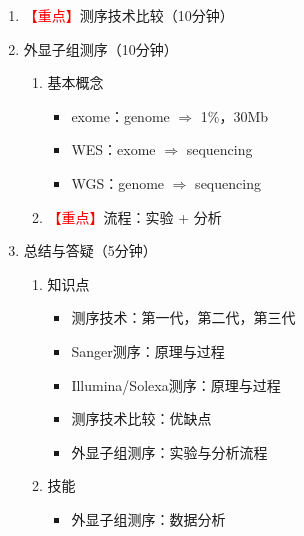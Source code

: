 \documentclass{TIJMUjiaoanLL}
\begin{document}
\begin{enumerate}
  \item \textcolor{red}{【重点】}测序技术比较（10分钟）

  \item 外显子组测序（10分钟）
    \begin{enumerate}
      \item 基本概念
        \begin{itemize}
          \item exome：genome $\Rightarrow$ 1\%，30Mb
          \item WES：exome $\Rightarrow$ sequencing
          \item WGS：genome $\Rightarrow$ sequencing
        \end{itemize}
      \item \textcolor{red}{【重点】}流程：实验 + 分析
    \end{enumerate}

  \item 总结与答疑（5分钟）
    \begin{enumerate}
      \item 知识点
	\begin{itemize}
	  \item 测序技术：第一代，第二代，第三代
	  \item Sanger测序：原理与过程
	  \item Illumina/Solexa测序：原理与过程
	  \item 测序技术比较：优缺点
	  \item 外显子组测序：实验与分析流程
	\end{itemize}
      \item 技能
	\begin{itemize}
	  \item 外显子组测序：数据分析
	\end{itemize}
    \end{enumerate}
\end{enumerate}

\otherTail
\end{document}
